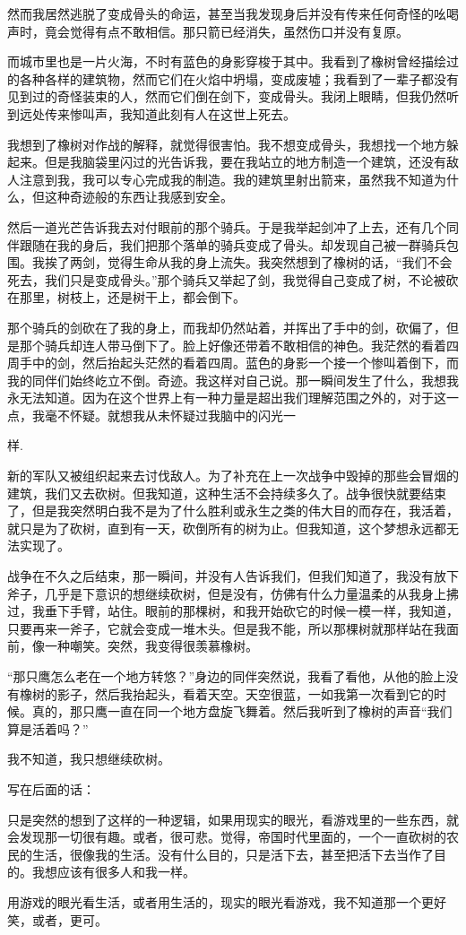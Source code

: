 \documentclass{article}
\begin{document}
然而我居然逃脱了变成骨头的命运，甚至当我发现身后并没有传来任何奇怪的吆喝声时，竟会觉得有点不敢相信。那只箭已经消失，虽然伤口并没有复原。

而城市里也是一片火海，不时有蓝色的身影穿梭于其中。我看到了橡树曾经描绘过的各种各样的建筑物，然而它们在火焰中坍塌，变成废墟；我看到了一辈子都没有见到过的奇怪装束的人，然而它们倒在剑下，变成骨头。我闭上眼睛，但我仍然听到远处传来惨叫声，我知道此刻有人在这世上死去。

\newpage 



我想到了橡树对作战的解释，就觉得很害怕。我不想变成骨头，我想找一个地方躲起来。但是我脑袋里闪过的光告诉我，要在我站立的地方制造一个建筑，还没有敌人注意到我，我可以专心完成我的制造。我的建筑里射出箭来，虽然我不知道为什么，但这种奇迹般的东西让我感到安全。

然后一道光芒告诉我去对付眼前的那个骑兵。于是我举起剑冲了上去，还有几个同伴跟随在我的身后，我们把那个落单的骑兵变成了骨头。却发现自己被一群骑兵包围。我挨了两剑，觉得生命从我的身上流失。我突然想到了橡树的话，“我们不会死去，我们只是变成骨头。”那个骑兵又举起了剑，我觉得自己变成了树，不论被砍在那里，树枝上，还是树干上，都会倒下。

那个骑兵的剑砍在了我的身上，而我却仍然站着，并挥出了手中的剑，砍偏了，但是那个骑兵却连人带马倒下了。脸上好像还带着不敢相信的神色。我茫然的看着四周手中的剑，然后抬起头茫然的看着四周。蓝色的身影一个接一个惨叫着倒下，而我的同伴们始终屹立不倒。奇迹。我这样对自己说。那一瞬间发生了什么，我想我永无法知道。因为在这个世界上有一种力量是超出我们理解范围之外的，对于这一点，我毫不怀疑。就想我从未怀疑过我脑中的闪光一

\newpage 

样.


新的军队又被组织起来去讨伐敌人。为了补充在上一次战争中毁掉的那些会冒烟的建筑，我们又去砍树。但我知道，这种生活不会持续多久了。战争很快就要结束了，但是我突然明白我不是为了什么胜利或永生之类的伟大目的而存在，我活着，就只是为了砍树，直到有一天，砍倒所有的树为止。但我知道，这个梦想永远都无法实现了。

战争在不久之后结束，那一瞬间，并没有人告诉我们，但我们知道了，我没有放下斧子，几乎是下意识的想继续砍树，但是没有，仿佛有什么力量温柔的从我身上拂过，我垂下手臂，站住。眼前的那棵树，和我开始砍它的时候一模一样，我知道，只要再来一斧子，它就会变成一堆木头。但是我不能，所以那棵树就那样站在我面前，像一种嘲笑。突然，我变得很羡慕橡树。

“那只鹰怎么老在一个地方转悠？”身边的同伴突然说，我看了看他，从他的脸上没有橡树的影子，然后我抬起头，看着天空。天空很蓝，一如我第一次看到它的时候。真的，那只鹰一直在同一个地方盘旋飞舞着。然后我听到了橡树的声音“我们算是活着吗？”

我不知道，我只想继续砍树。

\newpage 



写在后面的话：

只是突然的想到了这样的一种逻辑，如果用现实的眼光，看游戏里的一些东西，就会发现那一切很有趣。或者，很可悲。觉得，帝国时代里面的，一个一直砍树的农民的生活，很像我的生活。没有什么目的，只是活下去，甚至把活下去当作了目的。我想应该有很多人和我一样。

用游戏的眼光看生活，或者用生活的，现实的眼光看游戏，我不知道那一个更好笑，或者，更可。
\end{document}
